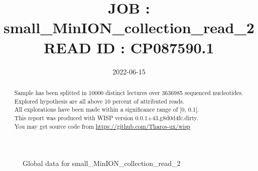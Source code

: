 \documentclass[12pt]{article}
\title{JOB : small\_MinION\_collection\_read\_2\\[0.2em]\smaller{}READ ID : CP087590.1}
\date{2022-06-15}
\begin{document}
\maketitle
\begin{abstract}
\begin{sloppypar}
Sample has been splitted in 10000 distinct lectures over 3636985 sequenced nucleotides.\\
Explored hypothesis are all above 10 percent of attributed reads.\\
All explorations have been made within a significance range of [0, 0.1[.\\
This report was produced with WISP version 0.0.1+43.g8d0d4fc.dirty. \\
You may get source code from \url{https://github.com/Tharos-ux/wisp}
\end{sloppypar}
\end{abstract}\begin{figure}[h]
\centering


\caption{Global data for small\_MinION\_collection\_read\_2}
\label{f-Global data for small\_MinION\_collection\_read\_2}
\end{figure}
\end{document}
